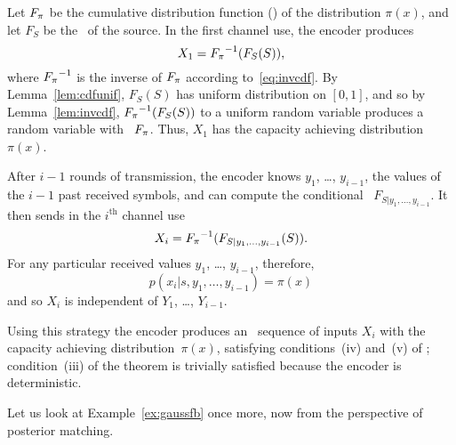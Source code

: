 Let ${F_{\pi}}$ be the cumulative distribution function (\cdf) of the distribution
$\pi(x)$, and let $F_S$ be the \cdf\ of the source. In the first channel
use, the encoder produces
\begin{equation}
  \label{eq:posteriorx1}
  X_1 = {F_{\pi}}^{-1}(F_S(S)),
\end{equation}
where ${F_{\pi}}^{-1}$ is the inverse of ${F_{\pi}}$ according to~\eqref{eq:invcdf}. By
Lemma~\ref{lem:cdfunif}, $F_S(S)$ has uniform distribution on $[0,1]$, and so by
Lemma~\ref{lem:invcdf}, ${F_{\pi}}^{-1}(F_S(S))$ to a uniform random variable
produces a random variable with \cdf\ ${F_{\pi}}$. Thus, $X_1$ has the capacity
achieving distribution~$\pi(x)$. 

After $i-1$ rounds of transmission, the encoder knows $y_1$, \ldots, $y_{i-1}$,
the values of the $i-1$ past received symbols, and can compute the conditional
\cdf\ $F_{S|y_1, \ldots, y_{i-1}}$. It then sends in the $i^{\text{th}}$ channel
use
\begin{equation}
  \label{eq:posteriorxi}
  X_i = {F_{\pi}}^{-1}(F_{S|y_1,\dots,y_{i-1}}(S)).
\end{equation}
For any particular received values $y_1$, \ldots, $y_{i-1}$, therefore,
\begin{equation*}
  p(x_i|s, y_1, \dots, y_{i-1}) = \pi(x)
\end{equation*}
and so $X_i$ is independent of $Y_1$, \ldots, $Y_{i-1}$. 

Using this strategy the encoder produces an \iid\ sequence of inputs $X_i$
with the capacity achieving distribution~$\pi(x)$, satisfying conditions~(iv)
and~(v) of ; condition~(iii) of the theorem is
trivially satisfied because the encoder is deterministic.

Let us look at Example~\ref{ex:gaussfb} once more, now from the perspective of
posterior matching.

